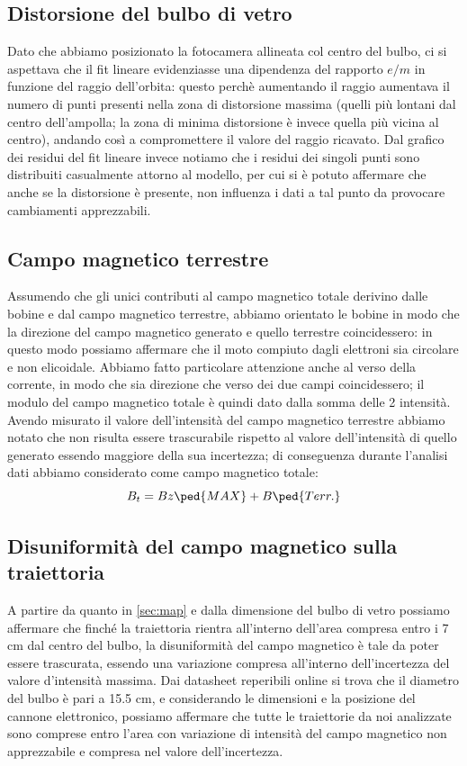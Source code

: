 \documentclass[10pt, a4paper, italian]{article}
\begin{document}
\subsection{Distorsione del bulbo di vetro}
Dato che abbiamo posizionato la fotocamera allineata col centro del bulbo, ci si aspettava che il fit lineare evidenziasse una dipendenza del rapporto $e/m$ in funzione del raggio dell'orbita: questo perchè aumentando il raggio aumentava il numero di punti presenti nella zona di distorsione massima (quelli più lontani dal centro dell'ampolla; la zona di minima distorsione è invece quella più vicina al centro), andando così a compromettere il valore del raggio ricavato.
Dal grafico dei residui del fit lineare invece notiamo che i residui dei singoli punti sono distribuiti casualmente attorno al modello, per cui si è potuto affermare che anche se la distorsione è presente, non influenza i dati a tal punto da provocare cambiamenti apprezzabili.

\subsection{Campo magnetico terrestre}
Assumendo che gli unici contributi al campo magnetico totale derivino dalle bobine e dal campo magnetico terrestre, abbiamo orientato le bobine in modo che la direzione del campo magnetico generato e quello terrestre coincidessero: in questo modo possiamo affermare che il moto compiuto dagli elettroni sia circolare e non elicoidale.
Abbiamo fatto particolare attenzione anche al verso della corrente, in modo che sia direzione che verso dei due campi coincidessero; il modulo del campo magnetico totale è quindi dato dalla somma delle 2 intensità.
Avendo misurato il valore dell'intensità del campo magnetico terrestre abbiamo notato che non risulta essere trascurabile rispetto al valore dell'intensità di quello generato essendo maggiore della sua incertezza; di conseguenza durante l'analisi dati abbiamo considerato come campo magnetico totale:
\[
B_t =Bz\ped{MAX} + B\ped{Terr.}
\]

\subsection{Disuniformità del campo magnetico sulla traiettoria}
A partire da quanto in \ref{sec:map} e dalla dimensione del bulbo di vetro possiamo affermare che finché la traiettoria rientra all'interno dell'area compresa entro i 7 cm dal centro del bulbo, la disuniformità del campo magnetico è tale da poter essere trascurata, essendo una variazione compresa all'interno dell'incertezza del valore d'intensità massima.
Dai datasheet reperibili online si trova che il diametro del bulbo è pari a 15.5 cm, e considerando le dimensioni e la posizione del cannone elettronico, possiamo affermare che tutte le traiettorie da noi analizzate sono comprese entro l'area con variazione di intensità del campo magnetico non apprezzabile e compresa nel valore dell'incertezza.
\end{document}
